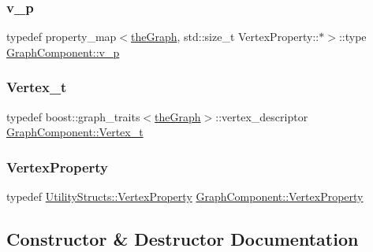 \subsubsection{\texorpdfstring{v\+\_\+p}{v\_p}}
{\footnotesize\ttfamily typedef property\+\_\+map$<$\hyperlink{class_graph_component_a982e0748a6e1b8dc74986f5f8b3dca5c_a982e0748a6e1b8dc74986f5f8b3dca5c}{the\+Graph}, std\+::size\+\_\+t Vertex\+Property\+::$\ast$$>$\+::type \hyperlink{class_graph_component_ad40772702161324303e24463a63738e9_ad40772702161324303e24463a63738e9}{Graph\+Component\+::v\+\_\+p}}

\mbox{\label{class_graph_component_ae67114a6ce5a001dc35e1996e1b45aa0_ae67114a6ce5a001dc35e1996e1b45aa0}} 
\subsubsection{\texorpdfstring{Vertex\+\_\+t}{Vertex\_t}}
{\footnotesize\ttfamily typedef boost\+::graph\+\_\+traits$<$\hyperlink{class_graph_component_a982e0748a6e1b8dc74986f5f8b3dca5c_a982e0748a6e1b8dc74986f5f8b3dca5c}{the\+Graph}$>$\+::vertex\+\_\+descriptor \hyperlink{class_graph_component_ae67114a6ce5a001dc35e1996e1b45aa0_ae67114a6ce5a001dc35e1996e1b45aa0}{Graph\+Component\+::\+Vertex\+\_\+t}}

\mbox{\label{class_graph_component_a7c0fcb3f03bf188b7df520e0cdd364b7_a7c0fcb3f03bf188b7df520e0cdd364b7}} 
\subsubsection{\texorpdfstring{Vertex\+Property}{VertexProperty}}
{\footnotesize\ttfamily typedef \hyperlink{struct_utility_structs_1_1_vertex_property}{Utility\+Structs\+::\+Vertex\+Property} \hyperlink{class_graph_component_a7c0fcb3f03bf188b7df520e0cdd364b7_a7c0fcb3f03bf188b7df520e0cdd364b7}{Graph\+Component\+::\+Vertex\+Property}}



\subsection{Constructor \& Destructor Documentation}
\mbox{\label{class_graph_component_a35c4a6e5c6f28751b1bd6c451cc07957_a35c4a6e5c6f28751b1bd6c451cc07957}} 
